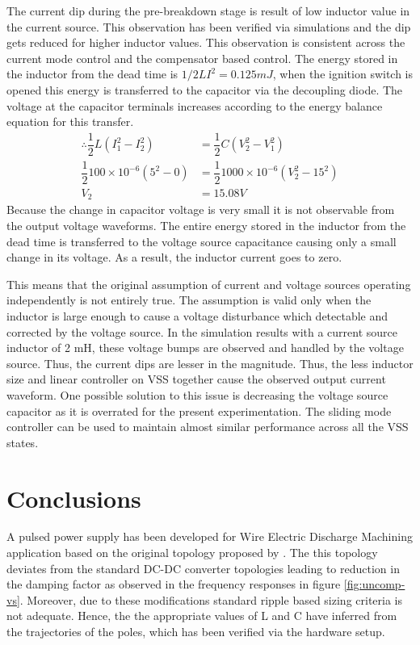 	The current dip during the pre-breakdown stage is result of low inductor value in the current source. This observation has been verified via simulations and the dip gets reduced for higher inductor values. This observation is consistent across the current mode control and the compensator based control. The energy stored in the inductor from the dead time is $1/2LI^2 = 0.125 mJ$, when the ignition switch is opened this energy is transferred to the capacitor via the decoupling diode. The voltage at the capacitor terminals increases according to the energy balance equation for this transfer.
	\begin{align*}
		\therefore \dfrac{1}{2}L(I_1^2 - I_2^2) &= \dfrac{1}{2}C(V_2^2 - V_1^2) \\
		\dfrac{1}{2}100\times 10^{-6}(5^2 - 0) &= \dfrac{1}{2}1000\times10^{-6}(V_2^2 - 15^2) \\
		V_2 &= 15.08 V
	\end{align*}
	Because the change in capacitor voltage is very small it is not observable from the output voltage waveforms. The entire energy stored in the inductor from the dead time is transferred to the voltage source capacitance causing only a small change in its voltage. As a result, the inductor current goes to zero.
	
	This means that the original assumption of current and voltage sources operating independently is not entirely true. The assumption is valid only when the inductor is large enough to cause a voltage disturbance which detectable and corrected by the voltage source. In the simulation results with a current source inductor of 2 mH, these voltage bumps are observed and handled by the voltage source. Thus, the current dips are lesser in the magnitude. Thus, the less inductor size and linear controller on VSS together cause the observed output current waveform. One possible solution to this issue is decreasing the voltage source capacitor as it is overrated for the present experimentation. The sliding mode controller can be used to maintain almost similar performance across all the VSS states.
\section{Conclusions}
\label{conclusions}
	A pulsed power supply has been developed for Wire Electric Discharge Machining application based on the original topology proposed by \citet{tastekin2009novel}. The this topology deviates from the standard DC-DC converter topologies leading to reduction in the damping factor as observed in the frequency responses in figure \ref{fig:uncomp-vs}. Moreover, due to these modifications standard ripple based sizing criteria is not adequate. Hence, the the appropriate values of L and C have inferred from the trajectories of the poles, which has been verified via the hardware setup.

